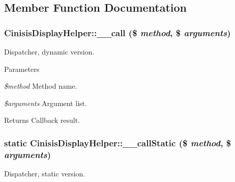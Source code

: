 \subsection{Member Function Documentation}
\hypertarget{classCinisisDisplayHelper_a5601da7181ece90313c1abe2fd0ae621}{
\subsubsection[{\_\-\_\-call}]{\setlength{\rightskip}{0pt plus 5cm}CinisisDisplayHelper::\_\-\_\-call (\$ {\em method}, \/  \$ {\em arguments})}}
\label{classCinisisDisplayHelper_a5601da7181ece90313c1abe2fd0ae621}
Dispatcher, dynamic version.


\begin{DoxyParams}{Parameters}
\item[{\em \$method}]Method name.\item[{\em \$arguments}]Argument list.\end{DoxyParams}
\begin{DoxyReturn}{Returns}
Callback result. 
\end{DoxyReturn}
\hypertarget{classCinisisDisplayHelper_abae906d7606b7d76ef5ed754835ba7e2}{
\subsubsection[{\_\-\_\-callStatic}]{\setlength{\rightskip}{0pt plus 5cm}static CinisisDisplayHelper::\_\-\_\-callStatic (\$ {\em method}, \/  \$ {\em arguments})}}
\label{classCinisisDisplayHelper_abae906d7606b7d76ef5ed754835ba7e2}
Dispatcher, static version.


